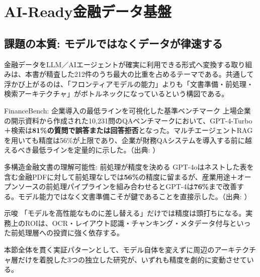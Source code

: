 \section{AI-Ready金融データ基盤}
\label{sec:data-infra}

\subsection{課題の本質: モデルではなくデータが律速する}

金融データをLLM／AIエージェントが確実に利用できる形式へ変換する取り組みは、本書が精査した212件のうち最大の比重を占めるテーマである。共通して浮かび上がるのは、「フロンティアモデルの能力」よりも「文書準備・前処理・検索アーキテクチャ」がボトルネックになっているという構図である。

\begin{casestudy}{FinanceBench: 企業導入の最低ラインを可視化した基準ベンチマーク}
上場企業の開示資料から作成された10,231問のQAベンチマークにおいて、GPT-4-Turbo＋検索は\textbf{81\%の質問で誤答または回答拒否}となった。マルチエージェントRAGを用いても精度は56\%が上限であり、企業が財務QAシステムを導入する前に越えるべき最低ラインを定量的に示した。（出典: \cite{financebench2023}）
\end{casestudy}

\begin{casestudy}{多構造金融文書の理解可能性: 前処理が精度を決める}
GPT-4oはネストした表を含む金融PDFに対して前処理なしでは\textbf{56\%}の精度に留まるが、産業用途＋オープンソースの前処理パイプラインを組み合わせるとGPT-4は\textbf{76\%}まで改善する。モデル能力ではなく文書準備こそが鍵であることを直接示した。（出典: \cite{multistructured2025}）
\end{casestudy}

\begin{insight}{示唆}
「モデルを高性能なものに差し替える」だけでは精度は頭打ちになる。実務上のROIは、OCR・レイアウト認識・チャンキング・メタデータ付与といった前処理層への投資に強く依存する。
\end{insight}

本節全体を貫く実証パターンとして、モデル自体を変えずに周辺のアーキテクチャ層だけを着脱した3つの独立した研究が、いずれも精度を劇的に変動させている。

